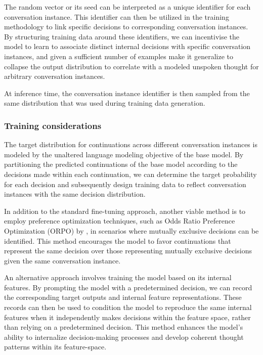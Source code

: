 \documentclass{article}
\begin{document}
The random vector or its seed can be interpreted as a unique identifier for each conversation instance. This identifier can then be utilized in the training methodology to link specific decisions to corresponding conversation instances. By structuring training data around these identifiers, we can incentivise the model to learn to associate distinct internal decisions with specific conversation instances, and given a sufficient number of examples make it generalize to collapse the output distribution to correlate with a modeled unspoken thought for arbitrary conversation instances. 

At inference time, the conversation instance identifier is then sampled from the same distribution that was used during training data generation.

\subsubsection{Training considerations}
The target distribution for continuations across different conversation instances is modeled by the unaltered language modeling objective of the base model. By partitioning the predicted continuations of the base model according to the decisions made within each continuation, we can determine the target probability for each decision and subsequently design training data to reflect conversation instances with the same decision distribution.

In addition to the standard fine-tuning approach, another viable method is to employ preference optimization techniques, such as Odds Ratio Preference Optimization (ORPO) by \cite{hong2024orpo}, in scenarios where mutually exclusive decisions can be identified. This method encourages the model to favor continuations that represent the same decision over those representing mutually exclusive decisions given the same conversation instance.

An alternative approach involves training the model based on its internal features. By prompting the model with a predetermined decision, we can record the corresponding target outputs and internal feature representations. These records can then be used to condition the model to reproduce the same internal features when it independently makes decisions within the feature space, rather than relying on a predetermined decision. This method enhances the model's ability to internalize decision-making processes and develop coherent thought patterns within its feature-space.
\end{document}
